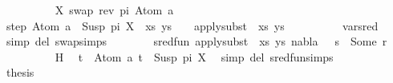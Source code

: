 \begin{isabellebody}
{}\isanewline
\ \ \ \ \ \ \isamarkupfalse%
\ {\isacharquery}{\kern0pt}{\isasymsigma}\ {\isacharequal}{\kern0pt}\ {\isachardoublequoteopen}{\isacharbrackleft}{\kern0pt}{\isacharparenleft}{\kern0pt}X{\isacharcomma}{\kern0pt}\ swap\ {\isacharparenleft}{\kern0pt}rev\ pi{\isacharparenright}{\kern0pt}\ {\isacharparenleft}{\kern0pt}Atom\ a{\isacharparenright}{\kern0pt}{\isacharparenright}{\kern0pt}{\isacharbrackright}{\kern0pt}{\isachardoublequoteclose}\isanewline
\ \ \ \ \ \ \isamarkupfalse%
\ step{\isacharcolon}{\kern0pt}\ {\isachardoublequoteopen}{\isacharparenleft}{\kern0pt}{\isacharparenleft}{\kern0pt}Atom\ a\ {\isasymapprox}{\isacharquery}{\kern0pt}\ Susp\ pi\ X{\isacharparenright}{\kern0pt}\ {\isacharhash}{\kern0pt}\ xs{\isacharcomma}{\kern0pt}\ ys{\isacharparenright}{\kern0pt}\ {\isasymturnstile}\ {\isacharquery}{\kern0pt}{\isasymsigma}\ {\isasymleadsto}\ apply{\isacharunderscore}{\kern0pt}subst\ {\isacharquery}{\kern0pt}{\isasymsigma}\ {\isacharparenleft}{\kern0pt}xs{\isacharcomma}{\kern0pt}\ ys{\isacharparenright}{\kern0pt}{\isachardoublequoteclose}\isanewline
\ \ \ \ \ \ \ \ \isamarkupfalse%
\ var{\isacharunderscore}{\kern0pt}{}{\isacharunderscore}{\kern0pt}sred\ \isamarkupfalse%
\ {\isacharparenleft}{\kern0pt}simp\ del{\isacharcolon}{\kern0pt}\ swap{\isachardot}{\kern0pt}simps{\isacharparenright}{\kern0pt}\isanewline
\ \ \ \ \ \ \isamarkupfalse%
\ {\isachardoublequoteopen}sred{\isacharunderscore}{\kern0pt}fun\ {\isacharparenleft}{\kern0pt}apply{\isacharunderscore}{\kern0pt}subst\ {\isacharquery}{\kern0pt}{\isasymsigma}\ {\isacharparenleft}{\kern0pt}xs{\isacharcomma}{\kern0pt}\ ys{\isacharparenright}{\kern0pt}{\isacharcomma}{\kern0pt}\ nabla{\isacharcomma}{\kern0pt}\ {\isacharquery}{\kern0pt}{\isasymsigma}\ {\isasymbullet}\ s{\isacharparenright}{\kern0pt}\ {\isacharequal}{\kern0pt}\ Some\ r{\isachardoublequoteclose}\isanewline
\ \ \ \ \ \ \ \ \isamarkupfalse%
\ H\ \isamarkupfalse%
\ {\isacartoucheopen}t{}\ {\isacharequal}{\kern0pt}\ Atom\ a{\isacartoucheclose}\ {\isacartoucheopen}t{}\ {\isacharequal}{\kern0pt}\ Susp\ pi\ X{\isacartoucheclose}\ \isamarkupfalse%
\ {\isacharparenleft}{\kern0pt}simp\ del{\isacharcolon}{\kern0pt}\ sred{\isacharunderscore}{\kern0pt}fun{\isachardot}{\kern0pt}simps{\isacharparenright}{\kern0pt}\isanewline
\ \ \ \ \ \ \isamarkupfalse%
\ \isamarkupfalse%
\ {\isacharquery}{\kern0pt}thesis\ \isamarkupfalse%

\end{isabellebody}
